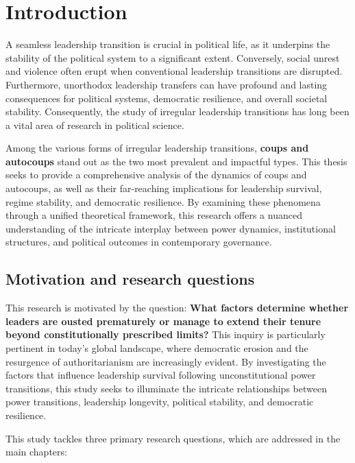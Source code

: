 \documentclass[
  12pt,
]{report}
\begin{document}
\chapter{Introduction}\label{introduction}

A seamless leadership transition is crucial in political life, as it
underpins the stability of the political system to a significant extent.
Conversely, social unrest and violence often erupt when conventional
leadership transitions are disrupted. Furthermore, unorthodox leadership
transfers can have profound and lasting consequences for political
systems, democratic resilience, and overall societal stability.
Consequently, the study of irregular leadership transitions has long
been a vital area of research in political science.

Among the various forms of irregular leadership transitions,
\textbf{coups and autocoups} stand out as the two most prevalent and
impactful types. This thesis seeks to provide a comprehensive analysis
of the dynamics of coups and autocoups, as well as their far-reaching
implications for leadership survival, regime stability, and democratic
resilience. By examining these phenomena through a unified theoretical
framework, this research offers a nuanced understanding of the intricate
interplay between power dynamics, institutional structures, and
political outcomes in contemporary governance.

\section{\texorpdfstring{\textbf{Motivation and research
questions}}{Motivation and research questions}}\label{motivation-and-research-questions}

This research is motivated by the question: \textbf{What factors
determine whether leaders are ousted prematurely or manage to extend
their tenure beyond constitutionally prescribed limits?} This inquiry is
particularly pertinent in today's global landscape, where democratic
erosion and the resurgence of authoritarianism are increasingly evident.
By investigating the factors that influence leadership survival
following unconstitutional power transitions, this study seeks to
illuminate the intricate relationships between power transitions,
leadership longevity, political stability, and democratic resilience.

This study tackles three primary research questions, which are addressed
in the main chapters:
\end{document}
